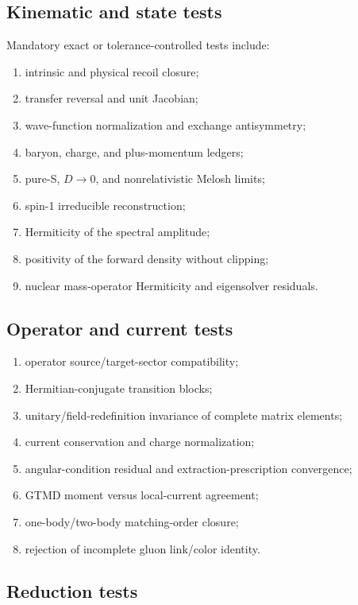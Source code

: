 \documentclass[11pt]{article}
\begin{document}
\subsection{Kinematic and state tests}

Mandatory exact or tolerance-controlled tests include:
\begin{enumerate}
\item intrinsic and physical recoil closure;
\item transfer reversal and unit Jacobian;
\item wave-function normalization and exchange antisymmetry;
\item baryon, charge, and plus-momentum ledgers;
\item pure-S, \(D\to0\), and nonrelativistic Melosh limits;
\item spin-1 irreducible reconstruction;
\item Hermiticity of the spectral amplitude;
\item positivity of the forward density without clipping;
\item nuclear mass-operator Hermiticity and eigensolver residuals.
\end{enumerate}

\subsection{Operator and current tests}

\begin{enumerate}
\item operator source/target-sector compatibility;
\item Hermitian-conjugate transition blocks;
\item unitary/field-redefinition invariance of complete matrix elements;
\item current conservation and charge normalization;
\item angular-condition residual and extraction-prescription convergence;
\item GTMD moment versus local-current agreement;
\item one-body/two-body matching-order closure;
\item rejection of incomplete gluon link/color identity.
\end{enumerate}

\subsection{Reduction tests}
\end{document}
